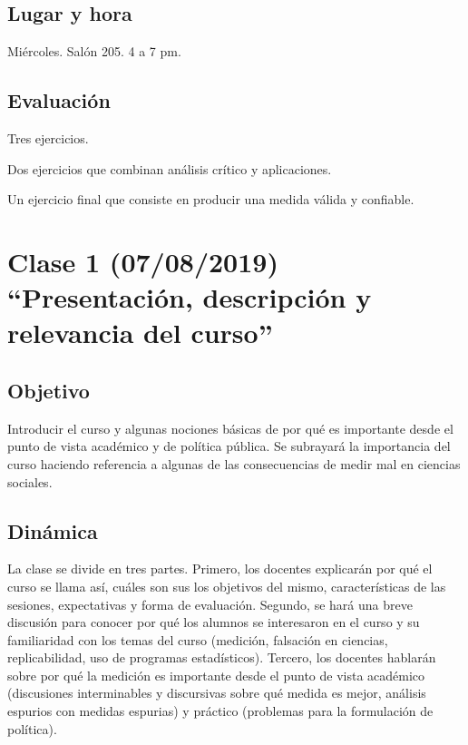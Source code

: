 \documentclass[11pt,]{article}
\begin{document}
\hypertarget{lugar-y-hora}{%
\subsection{Lugar y hora}\label{lugar-y-hora}}

Miércoles. Salón 205. 4 a 7 pm.

\hypertarget{evaluacion}{%
\subsection{Evaluación}\label{evaluacion}}

Tres ejercicios.

Dos ejercicios que combinan análisis crítico y aplicaciones.

Un ejercicio final que consiste en producir una medida válida y
confiable.

\newpage

\hypertarget{clase-1-07082019-presentacion-descripcion-y-relevancia-del-curso}{%
\section{Clase 1 (07/08/2019) ``Presentación, descripción y relevancia
del
curso''}\label{clase-1-07082019-presentacion-descripcion-y-relevancia-del-curso}}

\hypertarget{objetivo}{%
\subsection{Objetivo}\label{objetivo}}

Introducir el curso y algunas nociones básicas de por qué es importante
desde el punto de vista académico y de política pública. Se subrayará la
importancia del curso haciendo referencia a algunas de las consecuencias
de medir mal en ciencias sociales.

\hypertarget{dinamica}{%
\subsection{Dinámica}\label{dinamica}}

La clase se divide en tres partes. Primero, los docentes explicarán por
qué el curso se llama así, cuáles son sus los objetivos del mismo,
características de las sesiones, expectativas y forma de evaluación.
Segundo, se hará una breve discusión para conocer por qué los alumnos se
interesaron en el curso y su familiaridad con los temas del curso
(medición, falsación en ciencias, replicabilidad, uso de programas
estadísticos). Tercero, los docentes hablarán sobre por qué la medición
es importante desde el punto de vista académico (discusiones
interminables y discursivas sobre qué medida es mejor, análisis espurios
con medidas espurias) y práctico (problemas para la formulación de
política).
\end{document}
